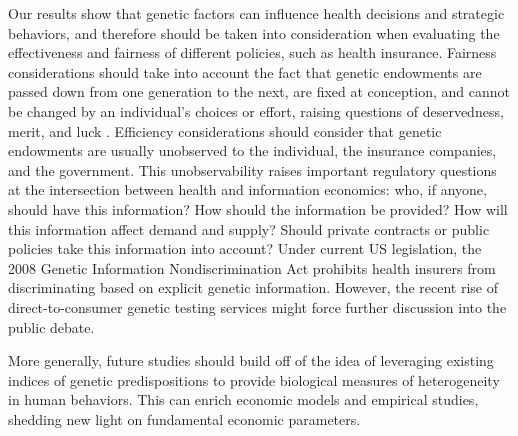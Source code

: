 \documentclass[11pt]{article}
\begin{document}
Our results show that genetic factors can influence health decisions and strategic behaviors, and therefore should be taken into consideration when evaluating the effectiveness and fairness of different policies, such as health insurance.
Fairness considerations should take into account the fact that genetic endowments are passed down from one generation to the next, are fixed at conception, and cannot be changed by an individual's choices or effort, raising questions of deservedness, merit, and luck \citep{Pereira2021,Harden2021,Kweon2020}.
Efficiency considerations should consider that genetic endowments are usually unobserved to the individual, the insurance companies, and the government.
This unobservability raises important regulatory questions at the intersection between health and information economics: who, if anyone, should have this information? How should the information be provided? How will this information affect demand and supply? Should private contracts or public policies take this information into account?
Under current US legislation, the 2008 Genetic Information Nondiscrimination Act prohibits health insurers from discriminating based on explicit genetic information.
However, the recent rise of direct-to-consumer genetic testing services might force further discussion into the public debate.

More generally, future studies should build off of the idea of leveraging existing indices of genetic predispositions to provide biological measures of heterogeneity in human behaviors.
This can enrich economic models and empirical studies, shedding new light on fundamental economic parameters.



\clearpage
\newpage

\singlespacing
%

%




\end{document}
